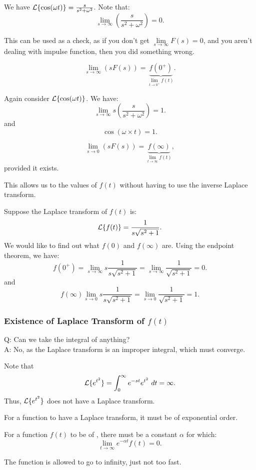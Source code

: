 \documentclass[../main/main.tex]{subfiles}
\begin{document}
\begin{example}
	We have $\mathcal{L}\{\cos(\omega t)\}= \frac{s}{s^2+\omega^2}$. Note that: \[
			\lim\limits_{s \to \infty} \left( \frac{s}{s^2+\omega^2} \right) =0
	.\] 
\end{example}
\begin{remark}
	This can be used as a check, as if you don't get $\lim\limits_{s \to \infty} F(s)=0$, and you aren't dealing with impulse function, then you did something wrong. 
\end{remark}
\begin{theorem} 
	\[
		\lim\limits_{s \to \infty} (sF(s))=\underbrace{f(0^{+})}_{\lim\limits_{t \to 0^+} f(t)}
	.\]
\end{theorem}
\begin{example}
	Again consider $\mathcal{L}\{\cos(\omega t)\}$. We have: \[
		\lim\limits_{s \to \infty} s\left( \frac{s}{s^2+\omega^2} \right) =1
	.\] and \[
	\cos(\omega \times t) = 1
	.\] 
\end{example}

\begin{theorem}
	 \[
		 \lim\limits_{s \to 0} (sF(s)) = \underbrace{f(\infty)}_{\lim\limits_{t \to \infty} f(t)}
	,\] provided it exists. 
\end{theorem}
\begin{remark}
	This allows us to the values of $f(t)$ without having to use the inverse Laplace transform.
\end{remark}
\begin{example}
	Suppose the Laplace transform of $f(t)$ is:  \[
		\mathcal{L}\{f(t)\} = \frac{1}{s\sqrt{s^2+1} }
	.\] We would like to find out what $f(0)$ and $f(\infty)$ are. Using the endpoint theorem, we have: \[
	f(0^{+}) = \lim\limits_{s \to \infty} s \frac{1}{s\sqrt{s^2+1} } = \lim\limits_{s \to \infty}  \frac{1}{\sqrt{s^2+1} } = 0
	.\] and \[
	f(\infty) \lim\limits_{s \to 0} s \frac{1}{s\sqrt{s^2+1} } = \lim\limits_{s \to 0} \frac{1}{\sqrt{s^2+1} }=1
	.\] 
\end{example}
\subsubsection{Existence of Laplace Transform of $f(t)$}
	Q: Can we take the integral of anything?\\
	A: No, as the Laplace transform is an improper integral, which must converge. 
	\begin{example}
		Note that  \[
			\mathcal{L}\{e^{t^2}\}=\int^\infty_0e^{-st}e^{t^2}~dt = \infty
		.\] Thus, $\mathcal{L}\{e^{t^2}\}$ does not have a Laplace transform.
	\end{example}
For a function to have a Laplace transform, it must be of exponential order.
\begin{definition} 
	For a function $f(t)$ to be of , there must be a constant $\alpha$ for which: \[
		\lim\limits_{t \to \infty} e^{-\alpha t}f(t) = 0
	.\] 
\end{definition}
The function is allowed to go to infinity, just not too fast.
\end{document}
